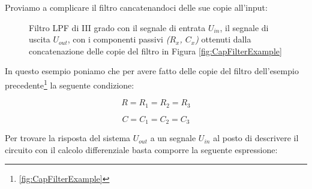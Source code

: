 \documentclass[a4paper, 10pt, final]{article} %
\begin{document}
    \noindent Proviamo a complicare il filtro cancatenandoci delle sue copie all'input:
    \begin{figure}[H]
        \centering
        \caption{Filtro LPF di III grado con il segnale di entrata $U_{in}$, il segnale di uscita $U_{out}$, con i componenti passivi \emph{($R_x$, $C_x$)} ottenuti dalla concatenazione delle copie del filtro in Figura \ref{fig:CapFilterExample}}
        \label{fig:CapFilterExample2}
    \end{figure}
    \noindent In questo esempio poniamo che per avere fatto delle copie del filtro dell'esempio precedente\footnote{\ref{fig:CapFilterExample}} la seguente condizione:
    \begin{figure}[H]
        \centering
        \begin{minipage}[b]{.31\linewidth}
            \centering
            \begin{equation*}
                R = R_1 = R_2 = R_3
            \end{equation*}
        \end{minipage}
        \hspace{0.04\linewidth}
        \begin{minipage}[b]{.31\linewidth}
            \centering
            \begin{equation*}
                C = C_1 = C_2 = C_3
            \end{equation*}
        \end{minipage}
    \end{figure}
    \noindent Per trovare la risposta del sistema $U_{out}$ a un segnale $U_{in}$ al posto di descrivere il circuito con il calcolo differenziale basta comporre la seguente espressione:
\end{document}
